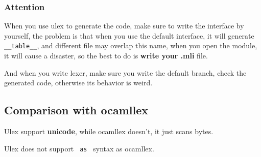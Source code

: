 \subsubsection{Attention}

When you use ulex to generate the code, make sure to write the
interface by yourself, the problem is that when you use the default
interface, it will generate \verb|__table__|, and different file may
overlap this name, when you open the module, it will cause a disaster,
so the best to do is \textbf{write your .mli} file.

And when you write lexer, make sure you write the default branch,
check the generated code, otherwise its behavior is weird.



\subsection{Comparison with ocamllex}
\label{Comparison with ocamllex}

Ulex support \textbf{unicode}, while ocamllex doesn't, it just scans bytes.

Ulex does not support \verb| as | syntax as ocamllex.
